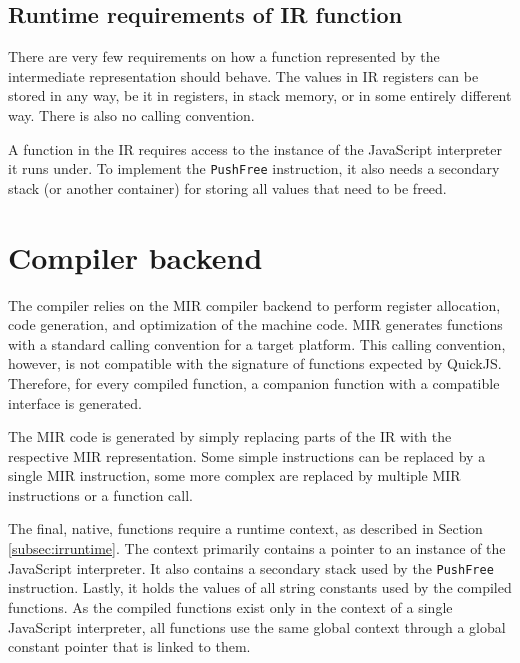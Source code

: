 
\subsection{Runtime requirements of IR function}\label{subsec:irruntime}

There are very few requirements on how a function represented by the intermediate representation should behave. The values in IR registers can be stored in any way, be it in registers, in stack memory, or in some entirely different way. There is also no calling convention.

A function in the IR requires access to the instance of the JavaScript interpreter it runs under. To implement the \texttt{PushFree} instruction, it also needs a secondary stack (or another container) for storing all values that need to be freed.


\section{Compiler backend}

The compiler relies on the MIR compiler backend to perform register allocation, code generation, and optimization of the machine code. MIR generates functions with a standard calling convention for a target platform. This calling convention, however, is not compatible with the signature of functions expected by QuickJS. Therefore, for every compiled function, a companion function with a compatible interface is generated.

The MIR code is generated by simply replacing parts of the IR with the respective MIR representation. Some simple instructions can be replaced by a single MIR instruction, some more complex are replaced by multiple MIR instructions or a function call.

The final, native, functions require a runtime context, as described in Section \ref{subsec:irruntime}. The context primarily contains a pointer to an instance of the JavaScript interpreter. It also contains a secondary stack used by the \texttt{PushFree} instruction. Lastly, it holds the values of all string constants used by the compiled functions. As the compiled functions exist only in the context of a single JavaScript interpreter, all functions use the same global context through a global constant pointer that is linked to them.


